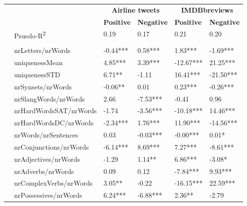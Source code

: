 \begin{tabular}{|l|l|l|l|l|l|} \cline{3-6}
\multicolumn{2}{c|}{} & \multicolumn{2}{c|}{\textbf{Airline tweets}} & \multicolumn{2}{c|}{\textbf{IMDBbreviews}}\\ \cline{3-6}
\multicolumn{2}{c|}{} & \textbf{Positive} & \textbf{Negative} & \textbf{Positive} & \textbf{Negative} \\ \cline{2-6}
 \multicolumn{1}{c|}{} & Psuedo-R\textsuperscript{2} & 0.19 & 0.17 & 0.21 & 0.20\\ \cline{2-6}
 \multicolumn{3}{c}{} \\ [-1.5ex] \hline
\parbox[t]{2mm}{} & nrLetters/nrWords & -0.44*** & \phantom{-}0.58*** & \phantom{-}1.83*** & -1.69*** \\ 
 & uniquenessMean & \phantom{-}4.85*** & \phantom{-}3.39*** & -12.67*** & \phantom{-}21.25*** \\ 
 & uniquenessSTD & \phantom{-}6.71** & -1.11 & \phantom{-}16.41*** & -21.50*** \\ \hline
\parbox[t]{2mm}{} & nrSynsets/nrWords & -0.06** & \phantom{-}0.01 & \phantom{-}0.23*** & -0.26*** \\ 
 & nrSlangWords/nrWords & \phantom{-}2.66 & -7.53*** & -0.41 & \phantom{-}0.96 \\ 
 & nrHardWordsSAT/nrWords & -1.74 & -3.56*** & -10.18*** & \phantom{-}14.46*** \\ 
 & nrHardWordsDC/nrWords & -2.34*** & \phantom{-}1.76*** & \phantom{-}11.90*** & -14.56*** \\ \hline
\parbox[t]{2mm}{} & nrWords/nrSentences & \phantom{-}0.03 & -0.03*** & -0.00*** & \phantom{-}0.01* \\ 
 & nrConjunctions/nrWords & -6.14*** & \phantom{-}8.69*** & \phantom{-}7.27*** & -8.61*** \\ 
 & nrAdjectives/nrWords & -1.29 & \phantom{-}1.14** & \phantom{-}6.86*** & -3.08* \\ 
 & nrAdverbs/nrWords & \phantom{-}0.09 & \phantom{-}0.12 & -7.84*** & \phantom{-}9.93*** \\ 
 & nrComplexVerbs/nrWords & \phantom{-}3.05** & -0.22 & -16.15*** & \phantom{-}22.59*** \\ 
 & nrPossessives/nrWords & \phantom{-}6.24*** & -6.88*** & \phantom{-}2.36** & -2.79 \\ 

\end{tabular}
